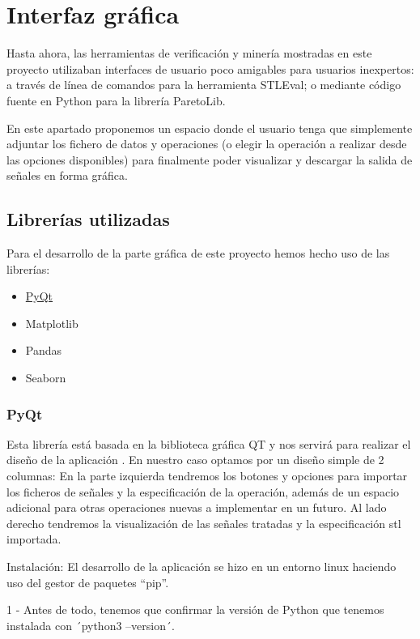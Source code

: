 \chapter{Interfaz gráfica}
\label{cha:gui}
 
Hasta ahora, las herramientas de verificación y minería mostradas en este proyecto utilizaban interfaces de usuario poco amigables para usuarios inexpertos: a través de línea de comandos para la herramienta STLEval; o mediante código fuente en Python para la librería ParetoLib.

En este apartado proponemos un espacio donde el usuario tenga que simplemente adjuntar los fichero de datos y operaciones (o elegir la operación a realizar desde las opciones disponibles) para finalmente poder visualizar y descargar la salida de señales en forma gráfica.
 
\section{Librerías utilizadas}

Para el desarrollo de la parte gráfica de este proyecto hemos hecho uso de las librerías:
\begin{itemize}
\item \href{https://www.qt.io/qt-for-python}{PyQt}
\item Matplotlib
\item Pandas
\item Seaborn
\end{itemize}
 
\subsection{PyQt}
Esta librería está basada en la biblioteca gráfica QT y nos servirá para realizar el diseño de la aplicación    . En nuestro caso optamos por un diseño simple de 2 columnas: En la parte izquierda tendremos los botones y opciones para importar los ficheros de señales y la especificación de la operación, además de un espacio adicional para otras operaciones nuevas a implementar en un futuro. Al lado derecho tendremos la visualización de las señales tratadas y la especificación stl importada.
 
Instalación: 
El desarrollo de la aplicación se hizo en un entorno linux haciendo uso del gestor de paquetes “pip”. 
 
1 - Antes de todo, tenemos que confirmar la versión de Python que tenemos instalada con ´python3 --version´.
 
